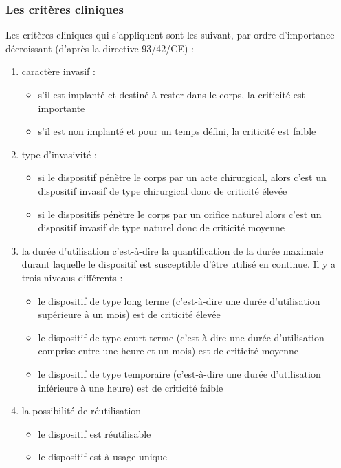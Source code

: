 \subsubsection{Les critères cliniques}
Les critères cliniques qui s'appliquent sont les suivant, par ordre d'importance décroissant (d'après la directive 93/42/CE) : 
\begin{enumerate}
\item caractère invasif : 
    \begin{itemize}
        \item s'il est implanté et destiné à rester dans le corps, la criticité est importante
        \item s'il est non implanté et pour un temps défini, la criticité est faible
    \end{itemize}
\item type d'invasivité : 
    \begin{itemize}
        \item si le dispositif pénètre le corps par un acte chirurgical, alors c'est un dispositif invasif de type chirurgical donc de criticité élevée
        \item si le dispositifs pénètre le corps par un orifice naturel alors c'est un dispositif invasif de type naturel donc de criticité moyenne
    \end{itemize}
\item la durée d'utilisation c'est-à-dire la quantification de la durée maximale durant laquelle le dispositif est susceptible d'être utilisé en continue. Il y a trois niveaus différents : 
    \begin{itemize}
        \item le dispositif de type long terme (c'est-à-dire une durée d'utilisation supérieure à un mois) est de criticité élevée
        \item le dispositif de type court terme (c'est-à-dire une durée d'utilisation comprise entre une heure et un mois) est de criticité moyenne
        \item le dispositif de type temporaire (c'est-à-dire une durée d'utilisation inférieure à une heure) est de criticité faible
    \end{itemize}
\item la possibilité de réutilisation 
    \begin{itemize}
        \item le dispositif est réutilisable
        \item le dispositif est à usage unique
    \end{itemize}

\end{enumerate}
